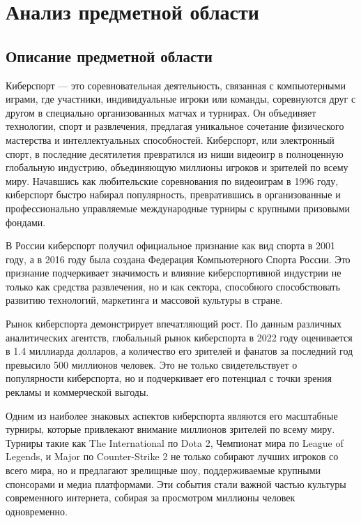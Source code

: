 \newsection
\section{Анализ предметной области}
\subsection{Описание предметной области}

Киберспорт — это соревновательная деятельность, связанная с компьютерными играми, где участники, индивидуальные игроки или команды, соревнуются друг с другом в специально организованных матчах и турнирах. Он объединяет технологии, спорт и развлечения, предлагая уникальное сочетание физического мастерства и интеллектуальных способностей. Киберспорт, или электронный спорт, в последние десятилетия превратился из ниши видеоигр в полноценную глобальную индустрию, объединяющую миллионы игроков и зрителей по всему миру. Начавшись как любительские соревнования по видеоиграм в 1996 году, киберспорт быстро набирал популярность, превратившись в организованные и профессионально управляемые международные турниры с крупными призовыми фондами.

В России киберспорт получил официальное признание как вид спорта в 2001 году, а в 2016 году была создана Федерация Компьютерного Спорта России. Это признание подчеркивает значимость и влияние киберспортивной индустрии не только как средства развлечения, но и как сектора, способного способствовать развитию технологий, маркетинга и массовой культуры в стране.

Рынок киберспорта демонстрирует впечатляющий рост. По данным различных аналитических агентств, глобальный рынок киберспорта в 2022 году оценивается в 1.4 миллиарда долларов, а количество его зрителей и фанатов за последний год превысило 500 миллионов человек. Это не только свидетельствует о популярности киберспорта, но и подчеркивает его потенциал с точки зрения рекламы и коммерческой выгоды.

Одним из наиболее знаковых аспектов киберспорта являются его масштабные турниры, которые привлекают внимание миллионов зрителей по всему миру. Турниры такие как The International по Dota 2, Чемпионат мира по League of Legends, и Major по Counter-Strike 2 не только собирают лучших игроков со всего мира, но и предлагают зрелищные шоу, поддерживаемые крупными спонсорами и медиа платформами. Эти события стали важной частью культуры современного интернета, собирая за просмотром миллионы человек одновременно.

